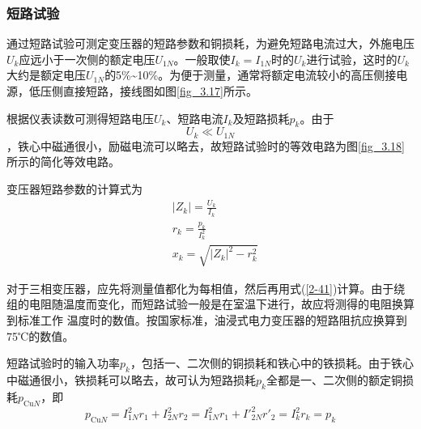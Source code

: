 \documentclass{book}
\begin{document}
\subsubsection{短路试验}
通过短路试验可测定变压器的短路参数和铜损耗，为避免短路电流过大，外施电压${{U}_{k}}$应远小于一次侧的额定电压${{U}_{1N}}$。一般取使${{I}_{k}}={{I}_{1N}}$时的${{U}_{k}}$进行试验，这时的${{U}_{k}}$大约是额定电压${{U}_{1N}}$的5\%\textasciitilde10\%。为便于测量，通常将额定电流较小的高压侧接电源，低压侧直接短路，接线图如图\ref{fig_3.17}所示。

根据仪表读数可测得短路电压${{U}_{k}}$、短路电流${{I}_{k}}$及短路损耗${{p}_{k}}$。由于\[{{U}_{k}}\ll {{U}_{1N}}\]，铁心中磁通很小，励磁电流可以略去，故短路试验时的等效电路为图\ref{fig_3.18}所示的简化等效电路。

变压器短路参数的计算式为
\begin{equation}
\begin{aligned}
& \left| {{Z}_{k}} \right|=\frac{{{U}_{k}}}{{{I}_{k}}} \\ 
& {{r}_{k}}=\frac{{{p}_{k}}}{I_{k}^{2}} \\ 
& {{x}_{k}}=\sqrt{{{\left| {{Z}_{k}} \right|}^{2}}-r_{k}^{2}} 
\end{aligned}
\label{2-41}
\end{equation}

对于三相变压器，应先将测量值都化为每相值，然后再用式(\ref{2-41})计算。由于绕组的电阻随温度而变化，而短路试验一般是在室温下进行，故应将测得的电阻换算到标准工作 温度时的数值。按国家标准，油浸式电力变压器的短路阻抗应换算到75℃的数值。

短路试验时的输入功率${{p}_{k}}$，包括一、二次侧的铜损耗和铁心中的铁损耗。由于铁心中磁通很小，铁损耗可以略去，故可认为短路损耗${{p}_{k}}$全都是一、二次侧的额定铜损耗${{p}_{\text{Cu}N}}$，即
\begin{equation}
{{p}_{\text{Cu}N}}=I_{1N}^{2}{{r}_{1}}+I_{2N}^{2}{{r}_{2}}=I_{1N}^{2}{{r}_{1}}+{I}\prime_{2N}^{2}{{{r}'}_{2}}=I_{k}^{2}{{r}_{k}}={{p}_{k}}
\label{2-42}
\end{equation}
\end{document}
